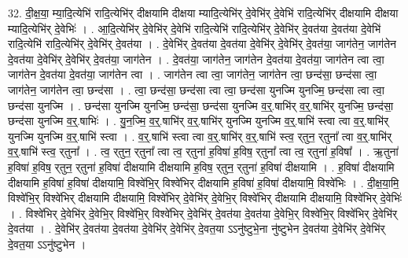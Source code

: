 \documentclass[17pt]{extarticle}
\begin{document}
32. दी॒क्ष॒या॒ म्या॒दि॒त्येभि॑ रादि॒त्येभि॑र् दीक्षयामि दीक्षया म्यादि॒त्येभि॑र् दे॒वेभि॑र् दे॒वेभि॑ रादि॒त्येभि॑र् दीक्षयामि दीक्षया म्यादि॒त्येभि॑र् दे॒वेभिः॑ । . आ॒दि॒त्येभि॑र् दे॒वेभि॑र् दे॒वेभि॑ रादि॒त्येभि॑ रादि॒त्येभि॑र् दे॒वेभि॑र् दे॒वत॑या दे॒वत॑या दे॒वेभि॑ रादि॒त्येभि॑ रादि॒त्येभि॑र् दे॒वेभि॑र् दे॒वत॑या । . दे॒वेभि॑र् दे॒वत॑या दे॒वत॑या दे॒वेभि॑र् दे॒वेभि॑र् दे॒वत॑या॒ जाग॑तेन॒ जाग॑तेन दे॒वत॑या दे॒वेभि॑र् दे॒वेभि॑र् दे॒वत॑या॒ जाग॑तेन । . दे॒वत॑या॒ जाग॑तेन॒ जाग॑तेन दे॒वत॑या दे॒वत॑या॒ जाग॑तेन त्वा त्वा॒ जाग॑तेन दे॒वत॑या दे॒वत॑या॒ जाग॑तेन त्वा । . जाग॑तेन त्वा त्वा॒ जाग॑तेन॒ जाग॑तेन त्वा॒ छन्द॑सा॒ छन्द॑सा त्वा॒ जाग॑तेन॒ जाग॑तेन त्वा॒ छन्द॑सा । . त्वा॒ छन्द॑सा॒ छन्द॑सा त्वा त्वा॒ छन्द॑सा युनज्मि युनज्मि॒ छन्द॑सा त्वा त्वा॒ छन्द॑सा युनज्मि । . छन्द॑सा युनज्मि युनज्मि॒ छन्द॑सा॒ छन्द॑सा युनज्मि व॒र्॒.षाभि॑र् व॒र्॒.षाभि॑र् युनज्मि॒ छन्द॑सा॒ छन्द॑सा युनज्मि व॒र्॒.षाभिः॑ । . यु॒न॒ज्मि॒ व॒र्॒.षाभि॑र् व॒र्॒.षाभि॑र् युनज्मि युनज्मि व॒र्॒.षाभि॑ स्त्वा त्वा व॒र्॒.षाभि॑र् युनज्मि युनज्मि व॒र्॒.षाभि॑ स्त्वा । . व॒र्॒.षाभि॑ स्त्वा त्वा व॒र्॒.षाभि॑र् व॒र्॒.षाभि॑ स्त्व॒ र्‌तुन॒ र्‌तुना᳚ त्वा व॒र्॒.षाभि॑र् व॒र्॒.षाभि॑ स्त्व॒ र्‌तुना᳚ । . त्व॒ र्‌तुन॒ र्‌तुना᳚ त्वा त्व॒ र्‌तुना॑ ह॒विषा॑ ह॒विष॒ र्‌तुना᳚ त्वा त्व॒ र्‌तुना॑ ह॒विषा᳚ । . ऋ॒तुना॑ ह॒विषा॑ ह॒विष॒ र्‌तुन॒ र्‌तुना॑ ह॒विषा॑ दीक्षयामि दीक्षयामि ह॒विष॒ र्‌तुन॒ र्‌तुना॑ ह॒विषा॑ दीक्षयामि । . ह॒विषा॑ दीक्षयामि दीक्षयामि ह॒विषा॑ ह॒विषा॑ दीक्षयामि॒ विश्वे॑भि॒र् विश्वे॑भिर् दीक्षयामि ह॒विषा॑ ह॒विषा॑ दीक्षयामि॒ विश्वे॑भिः । . दी॒क्ष॒या॒मि॒ विश्वे॑भि॒र् विश्वे॑भिर् दीक्षयामि दीक्षयामि॒ विश्वे॑भिर् दे॒वेभि॑र् दे॒वेभि॒र् विश्वे॑भिर् दीक्षयामि दीक्षयामि॒ विश्वे॑भिर् दे॒वेभिः॑ । . विश्वे॑भिर् दे॒वेभि॑र् दे॒वेभि॒र् विश्वे॑भि॒र् विश्वे॑भिर् दे॒वेभि॑र् दे॒वत॑या दे॒वत॑या दे॒वेभि॒र् विश्वे॑भि॒र् विश्वे॑भिर् दे॒वेभि॑र् दे॒वत॑या । . दे॒वेभि॑र् दे॒वत॑या दे॒वत॑या दे॒वेभि॑र् दे॒वेभि॑र् दे॒वत॒या ऽऽनु॑ष्टुभे॒ना नु॑ष्टुभेन दे॒वत॑या दे॒वेभि॑र् दे॒वेभि॑र् दे॒वत॒या ऽऽनु॑ष्टुभेन । \newline
\end{document}
